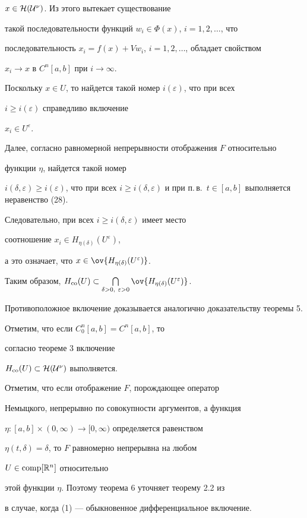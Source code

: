 $x\in\cal H(U^\nu)$. Из этого вытекает существование


такой последовательности функций $w_i\in\Phi(x)$, $i=1,2,\dotsc$, что


последовательность $x_i=f(x)+Vw_i$, $i=1,2,\dotsc$, обладает свойством


$x_i\to x$ в $C^n[a,b]$ при $i\to\infty$.


Поскольку $x\in U$, то найдется такой номер $i(\varepsilon)$, что при всех


$i\ge i(\varepsilon)$ справедливо включение


$x_i\in U^\varepsilon$.


Далее, согласно равномерной непрерывности отображения $F$ относительно


функции $\eta$, найдется такой номер


$i(\delta, \varepsilon)\ge i(\varepsilon)$, что при всех $i\ge i(\delta,


\varepsilon)$ и при п.\,в.~$t\in[a,b]$ выполняется неравенство (28).


Следовательно, при всех $i\ge i(\delta, \varepsilon)$ имеет место


соотношение $x_i\in H_{\eta(\delta)}(U^\varepsilon)$,


а это означает, что $x\in\ov{H_{\eta(\delta)}(U^\varepsilon)}$.


Таким образом, $H_{\co}(U)\subset


\bigcap\limits_{\delta>0,\ \varepsilon>0}


\ov{H_{\eta(\delta)}(U^\varepsilon)}$.


Противоположное включение доказывается аналогично доказательству теоремы 5.





\begin{note} Отметим, что если $C^n_0[a,b]=C^n[a,b]$, то


согласно теореме 3 включение


$H_{\operatorname{co}}(U)\subset\cal H(U^\nu)$ выполняется.


\end{note}





\begin{note} Отметим, что если отображение $F$, порождающее оператор


Немыцкого, непрерывно по совокупности аргументов, а функция


$\eta:[a,b]\times (0,\infty)\to [0,\infty)$ определяется равенством


$\eta(t,\delta)=\delta$, то $F$ равномерно непрерывна на любом


$U\in\operatorname{comp}[\Bbb R^n]$ относительно


этой функции $\eta$. Поэтому теорема 6 уточняет теорему 2.2 из \cite{2}


в случае, когда (1) --- обыкновенное дифференциальное включение.


\end{note}






